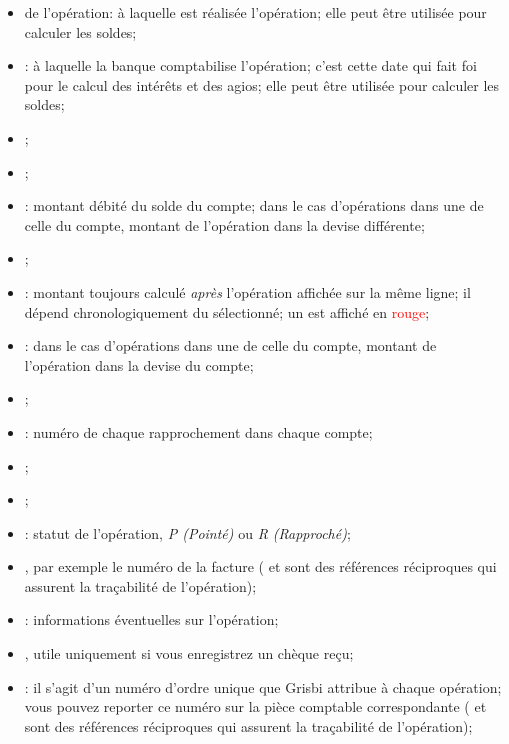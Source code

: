 \begin{itemize}
	\item {} de l'opération:  à laquelle est réalisée l'opération; elle peut être utilisée pour calculer les soldes;
	\item {}:  à laquelle la banque comptabilise l'opération; c'est cette date qui fait foi pour le calcul des intérêts et des agios; elle peut être utilisée pour calculer les soldes;
	\item {};
	\item {};
	\item {}: montant débité du solde du compte; dans le cas d'opérations dans une  de celle du compte, montant de l'opération dans la devise différente;
	\item {};
	\item {}: montant toujours calculé \emph{après} l'opération affichée sur la même ligne; il dépend chronologiquement du  sélectionné; un  est affiché en \textcolor{red}{rouge};
	\item {}: dans le cas d'opérations dans une  de celle du compte, montant de l'opération dans la devise du compte;
	\item {};
	\item {}: numéro de chaque rapprochement dans chaque compte;
	\item {};
	\item {};
	\item {}: statut de l'opération, \emph{P (Pointé)} ou \emph{R (Rapproché)};
	\item {}, par exemple le numéro de la facture ( et  sont des références réciproques qui assurent la traçabilité de l'opération);
	\item {}: informations éventuelles sur l'opération;
	\item {}, utile uniquement si vous enregistrez un chèque reçu;
	\item {}: il s'agit d'un numéro d'ordre unique que Grisbi attribue à chaque opération; vous pouvez reporter ce numéro sur la pièce comptable correspondante ( et  sont des références réciproques qui assurent la traçabilité de l'opération);

\end{itemize}
